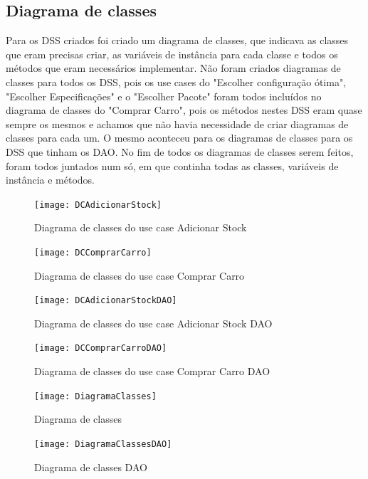 \documentclass[10pt, a4paper]{article}
\begin{document}
\subsection{Diagrama de classes}
Para os DSS criados foi criado um diagrama de classes, que indicava as classes que eram precisas criar, as variáveis de instância para cada classe e todos os métodos que eram necessários implementar. Não foram criados diagramas de classes para todos os DSS, pois os use cases do "Escolher configuração ótima", "Escolher Especificações" e o "Escolher Pacote" foram todos incluídos no diagrama de classes do "Comprar Carro", pois os métodos nestes DSS eram quase sempre os mesmos e achamos que não havia necessidade de criar diagramas de classes para cada um. O mesmo aconteceu para os diagramas de classes para os DSS que tinham os DAO.
No fim de todos os diagramas de classes serem feitos, foram todos juntados num só, em que continha todas as classes, variáveis de instância e métodos.

\begin{figure}[!htb]
\centering
\texttt{[image: DCAdicionarStock]}
\caption{Diagrama de classes do use case Adicionar Stock}
\label{DCAS}
\end{figure}

\begin{figure}[!htb]
\centering
\texttt{[image: DCComprarCarro]}
\caption{Diagrama de classes do use case Comprar Carro}
\label{DCCP}
\end{figure}

\begin{figure}[!htb]
\centering
\texttt{[image: DCAdicionarStockDAO]}
\caption{Diagrama de classes do use case Adicionar Stock DAO}
\label{DCASDAO}
\end{figure}

\begin{figure}[!htb]
\centering
\texttt{[image: DCComprarCarroDAO]}
\caption{Diagrama de classes do use case Comprar Carro DAO}
\label{DCCPDAO}
\end{figure}

\begin{figure}[!htb]
\centering
\texttt{[image: DiagramaClasses]}
\caption{Diagrama de classes}
\label{DC}
\end{figure}

\begin{figure}[!htb]
\centering
\texttt{[image: DiagramaClassesDAO]}
\caption{Diagrama de classes DAO}
\label{DC}
\end{figure}
\end{document}
